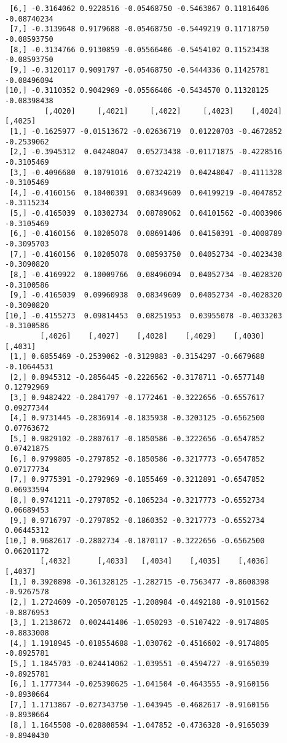 \documentclass[
  letterpaper,
  DIV=11,
  numbers=noendperiod]{scrreprt}
\begin{document}
\begin{verbatim}
 [6,] -0.3164062 0.9228516 -0.05468750 -0.5463867 0.11816406 -0.08740234
 [7,] -0.3139648 0.9179688 -0.05468750 -0.5449219 0.11718750 -0.08593750
 [8,] -0.3134766 0.9130859 -0.05566406 -0.5454102 0.11523438 -0.08593750
 [9,] -0.3120117 0.9091797 -0.05468750 -0.5444336 0.11425781 -0.08496094
[10,] -0.3110352 0.9042969 -0.05566406 -0.5434570 0.11328125 -0.08398438
         [,4020]     [,4021]     [,4022]     [,4023]    [,4024]    [,4025]
 [1,] -0.1625977 -0.01513672 -0.02636719  0.01220703 -0.4672852 -0.2539062
 [2,] -0.3945312  0.04248047  0.05273438 -0.01171875 -0.4228516 -0.3105469
 [3,] -0.4096680  0.10791016  0.07324219  0.04248047 -0.4111328 -0.3105469
 [4,] -0.4160156  0.10400391  0.08349609  0.04199219 -0.4047852 -0.3115234
 [5,] -0.4165039  0.10302734  0.08789062  0.04101562 -0.4003906 -0.3105469
 [6,] -0.4160156  0.10205078  0.08691406  0.04150391 -0.4008789 -0.3095703
 [7,] -0.4160156  0.10205078  0.08593750  0.04052734 -0.4023438 -0.3090820
 [8,] -0.4169922  0.10009766  0.08496094  0.04052734 -0.4028320 -0.3100586
 [9,] -0.4165039  0.09960938  0.08349609  0.04052734 -0.4028320 -0.3090820
[10,] -0.4155273  0.09814453  0.08251953  0.03955078 -0.4033203 -0.3100586
        [,4026]    [,4027]    [,4028]    [,4029]    [,4030]     [,4031]
 [1,] 0.6855469 -0.2539062 -0.3129883 -0.3154297 -0.6679688 -0.10644531
 [2,] 0.8945312 -0.2856445 -0.2226562 -0.3178711 -0.6577148  0.12792969
 [3,] 0.9482422 -0.2841797 -0.1772461 -0.3222656 -0.6557617  0.09277344
 [4,] 0.9731445 -0.2836914 -0.1835938 -0.3203125 -0.6562500  0.07763672
 [5,] 0.9829102 -0.2807617 -0.1850586 -0.3222656 -0.6547852  0.07421875
 [6,] 0.9799805 -0.2797852 -0.1850586 -0.3217773 -0.6547852  0.07177734
 [7,] 0.9775391 -0.2792969 -0.1855469 -0.3212891 -0.6547852  0.06933594
 [8,] 0.9741211 -0.2797852 -0.1865234 -0.3217773 -0.6552734  0.06689453
 [9,] 0.9716797 -0.2797852 -0.1860352 -0.3217773 -0.6552734  0.06445312
[10,] 0.9682617 -0.2802734 -0.1870117 -0.3222656 -0.6562500  0.06201172
        [,4032]      [,4033]   [,4034]    [,4035]    [,4036]    [,4037]
 [1,] 0.3920898 -0.361328125 -1.282715 -0.7563477 -0.8608398 -0.9267578
 [2,] 1.2724609 -0.205078125 -1.208984 -0.4492188 -0.9101562 -0.8876953
 [3,] 1.2138672  0.002441406 -1.050293 -0.5107422 -0.9174805 -0.8833008
 [4,] 1.1918945 -0.018554688 -1.030762 -0.4516602 -0.9174805 -0.8925781
 [5,] 1.1845703 -0.024414062 -1.039551 -0.4594727 -0.9165039 -0.8925781
 [6,] 1.1777344 -0.025390625 -1.041504 -0.4643555 -0.9160156 -0.8930664
 [7,] 1.1713867 -0.027343750 -1.043945 -0.4682617 -0.9160156 -0.8930664
 [8,] 1.1645508 -0.028808594 -1.047852 -0.4736328 -0.9165039 -0.8940430

\end{verbatim}
\end{document}
